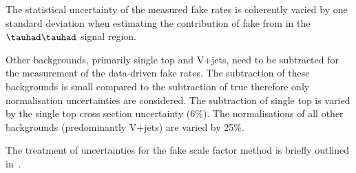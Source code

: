 The statistical uncertainty of the measured fake rates is coherently varied by
one standard deviation when estimating the contribution of fake \tauhad from
\ttbar in the $\tauhad\tauhad$ signal region.

Other backgrounds, primarily single top and V+jets, need to be subtracted for
the measurement of the data-driven fake rates. The subtraction of these
backgrounds is small compared to the subtraction of true \tauhad \ttbar
therefore only normalisation uncertainties are considered. The subtraction of
single top is varied by the single top cross section uncertainty (6\%). The
normalisations of all other backgrounds (predominantly V+jets) are varied by
25\%.

The treatment of uncertainties for the fake scale factor method is briefly
outlined in~.